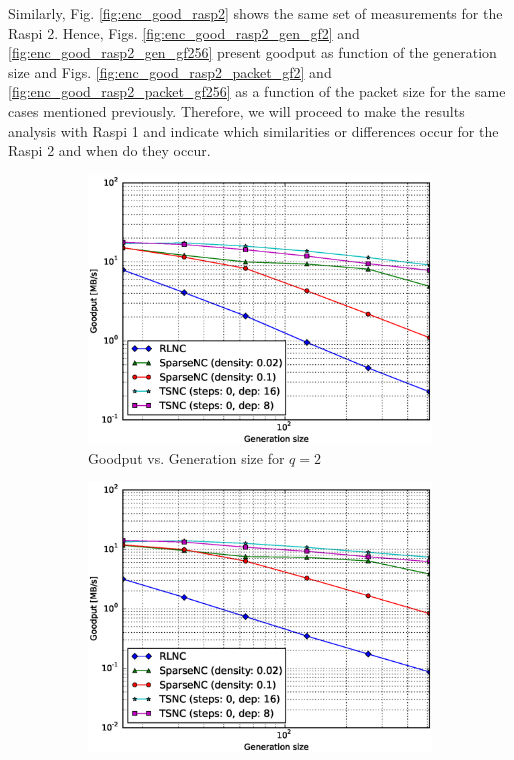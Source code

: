 Similarly, Fig. \ref{fig:enc_good_rasp2} shows the same set of
measurements for the \ac{Raspi} 2. Hence, Figs.
\ref{fig:enc_good_rasp2_gen_gf2} and \ref{fig:enc_good_rasp2_gen_gf256}
present goodput as function of the generation size  and
Figs. \ref{fig:enc_good_rasp2_packet_gf2} and
\ref{fig:enc_good_rasp2_packet_gf256} as a function of the packet size
for the same cases mentioned previously. Therefore, we will proceed
to make the results analysis with \ac{Raspi} 1 and indicate which
similarities or differences occur for the \ac{Raspi} 2 and when do
they occur.
%
\begin{figure}
    \centering
    \begin{subfigure}[b]{0.475\textwidth}
        \centering
        \includegraphics[width=1.15\textwidth]{images/23_07_2015/goodput_vs_generation_size_Rasp_encoder_Binary_1600.eps}
        \caption[]%
        {{\small Goodput vs. Generation size for $q = 2$}}
        \label{fig:enc_good_rasp1_gen_gf2}
    \end{subfigure}
    \hfill
    \begin{subfigure}[b]{0.475\textwidth}
        \centering
        \includegraphics[width=1.15\textwidth]{images/23_07_2015/goodput_vs_generation_size_Rasp_encoder_Binary8_1600.eps}

\end{subfigure}
\end{figure}
